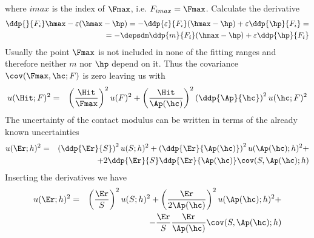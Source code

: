 where $imax$ is the index of $\Fmax$, i.e. $F_{imax}=\Fmax$.
Calculate the derivative
\begin{eqnarray*}
 \ddp{ }{ F_i} \hmax - \varepsilon (\hmax-\hp) =
 - \ddp{ \varepsilon}{ F_i} (\hmax-\hp) +  \varepsilon \ddp{ \hp}{ F_i} = \\
 =- \depsdm \ddp{ m}{ F_i} (\hmax-\hp) +  \varepsilon \ddp{ \hp}{ F_i}
\end{eqnarray*}
Usually the point $\Fmax$ is not included in none of the fitting ranges and therefore neither $m$ nor $\hp$ depend on it. Thus the covariance $\cov(\Fmax,\hc;F)$ is zero leaving us with
\begin{eqnarray*}
 u(\Hit;F)^2 &=& 
 \left( \frac{\Hit}{ \Fmax}\right)^2 u(F)^2 + 
 \left( \frac{\Hit}{\Ap(\hc)} \right)^2 \left(\ddp{ \Ap}{ \hc}  \right)^2 u(\hc;F)^2
\end{eqnarray*}
The uncertainty of the contact modulus can be written in terms of the already known uncertainties
\begin{eqnarray*}
 u(\Er;h)^2 &=& 
 \left( \ddp{ \Er}{ S}\right)^2 u(S;h)^2 + 
 \left( \ddp{ \Er}{ \Ap(\hc)} \right)^2 u(\Ap(\hc);h)^2 + \\ 
  && + 2  \ddp{ \Er}{ S}\ddp{ \Er}{ \Ap(\hc)} \cov(S,\Ap(\hc);h)  
\end{eqnarray*}
Inserting the derivatives we have
\begin{eqnarray*}
u(\Er;h)^2 &=& 
 \left( \frac{ \Er}{ S}\right)^2 u(S;h)^2 + 
 \left( \frac{ \Er}{ 2\Ap(\hc)} \right)^2 u(\Ap(\hc);h)^2 + \\ 
  && -  \frac{ \Er}{ S}\frac{ \Er}{ \Ap(\hc)} \cov(S,\Ap(\hc);h)   
\end{eqnarray*}

